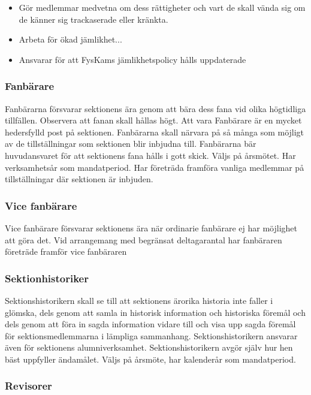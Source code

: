 \documentclass{../resources/dgovdoc}
\begin{document}
\begin{itemize}

\item Gör medlemmar medvetna om dess rättigheter och vart de skall vända sig om de känner sig trackaserade eller kränkta.
\item Arbeta för ökad jämlikhet...
\item Ansvarar för att FysKams jämlikhetspolicy hålls uppdaterade

\end{itemize}

\subsubsection{Fanbärare}

Fanbärarna försvarar sektionens ära genom att bära dess fana vid olika högtidliga tillfällen.
Observera att fanan skall hållas högt. Att vara Fanbärare är en mycket hedersfylld post på sektionen. 
Fanbärarna skall närvara på så många som möjligt av de tillställningar som sektionen blir inbjudna till.
Fanbärarna bär huvudansvaret för att sektionens fana hålls i gott skick. 
Väljs på årsmötet. Har verksamhetsår som mandatperiod. Har företräda framföra vanliga medlemmar på
tillställningar där sektionen är inbjuden.

\subsubsection{Vice fanbärare}

Vice fanbärare försvarar sektionens ära när ordinarie fanbärare ej har möjlighet att göra det. 
Vid arrangemang med begränsat deltagarantal har fanbäraren företräde framför vice fanbäraren

\subsubsection{Sektionhistoriker}

Sektionshistorikern skall se till att sektionens ärorika historia inte faller i glömska, dels genom att samla in historisk information och historiska föremål och dels genom att föra in sagda information vidare till och visa upp sagda föremål för sektionsmedlemmarna i lämpliga sammanhang. 
Sektionshistorikern ansvarar även för sektionens alumniverksamhet. 
Sektionshistorikern avgör själv hur hen bäst uppfyller ändamålet. Väljs på årsmöte, har kalenderår som mandatperiod. 

\subsubsection{Revisorer}
\end{document}

